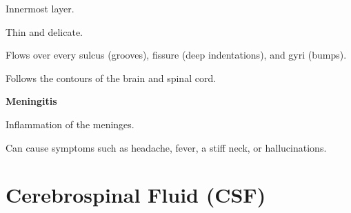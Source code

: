 \begin{coloredlist}
\begin{coloredlist}
        \item Innermost layer.
        \item Thin and delicate.
        \item Flows over every sulcus (grooves), fissure (deep indentations), and gyri (bumps).
        \item Follows the contours of the brain and spinal cord.
    \end{coloredlist}
    \item \textbf{Meningitis}
    \begin{coloredlist}
        \item Inflammation of the meninges.
        \item Can cause symptoms such as headache, fever, a stiff neck, or hallucinations.
    \end{coloredlist}
\end{coloredlist}

\section{Cerebrospinal Fluid (CSF)}

